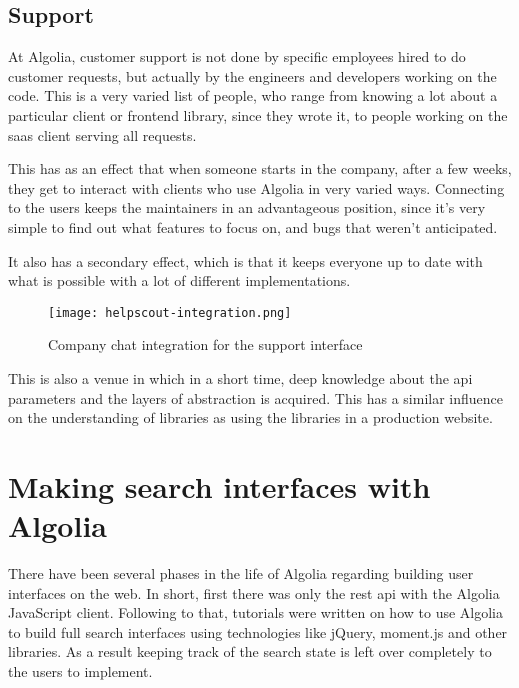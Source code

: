 \subsection{Support}
\label{support}

At Algolia, customer support is not done by specific employees hired to do customer requests, but actually by the engineers and developers working on the code. This is a very varied list of people, who range from knowing a lot about a particular client or frontend \gls{library}, since they wrote it, to people working on the \gls{saas} client serving all requests.

This has as an effect that when someone starts in the company, after a few weeks, they get to interact with clients who use Algolia in very varied ways. Connecting to the users keeps the maintainers in an advantageous position, since it's very simple to find out what features to focus on, and bugs that weren't anticipated.

It also has a secondary effect, which is that it keeps everyone up to date with what is possible with a lot of different implementations.

\begin{figure}[H]
  \centering
  \texttt{[image: helpscout-integration.png]}
  \caption{Company chat integration for the support interface}
  \label{figure:support}
\end{figure}

This is also a venue in which in a short time, deep knowledge about the \acrshort{api} parameters and the layers of abstraction is acquired. This has a similar influence on the understanding of libraries as using the libraries in a production website.

\section{Making search interfaces with Algolia} %
\label{sec:making_search_interfaces_with_algolia}

There have been several phases in the life of Algolia regarding building user interfaces on the web. In short, first there was only the \acrshort{rest} \acrshort{api} with the Algolia JavaScript client. Following to that, tutorials were written on how to use Algolia to build full search interfaces using technologies like jQuery, moment.js and other libraries. As a result keeping track of the search state is left over completely to the users to implement.

